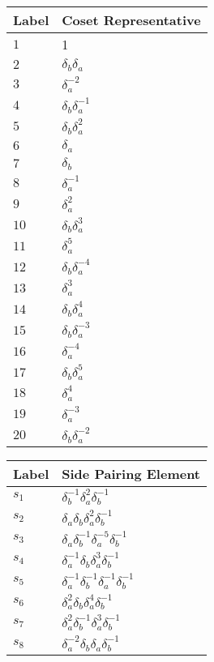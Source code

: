 \documentclass{article}
\begin{document}
\begin{center}
\begin{tabular}{ll}
\toprule
Label & Coset Representative\\
\midrule
$1$ & 1 \\
$2$ & $\delta_b^{}\delta_a^{}$ \\
$3$ & $\delta_a^{-2}$ \\
$4$ & $\delta_b^{}\delta_a^{-1}$ \\
$5$ & $\delta_b^{}\delta_a^{2}$ \\
$6$ & $\delta_a^{}$ \\
$7$ & $\delta_b^{}$ \\
$8$ & $\delta_a^{-1}$ \\
$9$ & $\delta_a^{2}$ \\
$10$ & $\delta_b^{}\delta_a^{3}$ \\
$11$ & $\delta_a^{5}$ \\
$12$ & $\delta_b^{}\delta_a^{-4}$ \\
$13$ & $\delta_a^{3}$ \\
$14$ & $\delta_b^{}\delta_a^{4}$ \\
$15$ & $\delta_b^{}\delta_a^{-3}$ \\
$16$ & $\delta_a^{-4}$ \\
$17$ & $\delta_b^{}\delta_a^{5}$ \\
$18$ & $\delta_a^{4}$ \\
$19$ & $\delta_a^{-3}$ \\
$20$ & $\delta_b^{}\delta_a^{-2}$ \\
\bottomrule
\end{tabular}
\hfill
\begin{tabular}{ll}
\toprule
Label & Side Pairing Element\\
\midrule
$s_{1}$ & $\delta_b^{-1}\delta_a^{2}\delta_b^{-1}$ \\
$s_{2}$ & $\delta_a^{}\delta_b^{}\delta_a^{2}\delta_b^{-1}$ \\
$s_{3}$ & $\delta_a^{}\delta_b^{-1}\delta_a^{-5}\delta_b^{-1}$ \\
$s_{4}$ & $\delta_a^{-1}\delta_b^{}\delta_a^{3}\delta_b^{-1}$ \\
$s_{5}$ & $\delta_a^{-1}\delta_b^{-1}\delta_a^{-1}\delta_b^{-1}$ \\
$s_{6}$ & $\delta_a^{2}\delta_b^{}\delta_a^{4}\delta_b^{-1}$ \\
$s_{7}$ & $\delta_a^{2}\delta_b^{-1}\delta_a^{3}\delta_b^{-1}$ \\
$s_{8}$ & $\delta_a^{-2}\delta_b^{}\delta_a^{}\delta_b^{-1}$ \\

\end{tabular}
\end{center}
\end{document}
